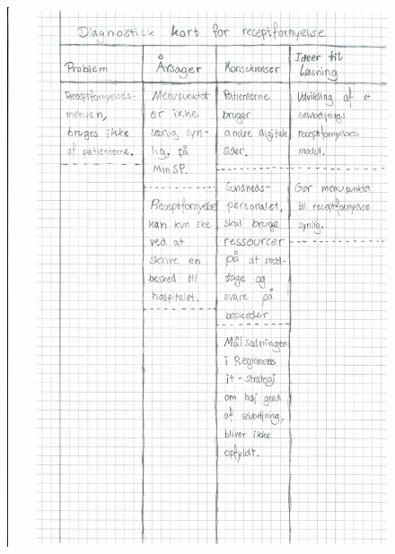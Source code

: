 \begin{figure}[H]
	\centering
	\includegraphics[angle=0, height=1.05\textheight]{Materials/DV_Kort1.pdf}
	\label{fig:DVkort1}
\end{figure}
